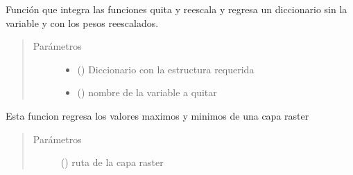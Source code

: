 \documentclass[letterpaper,10pt,spanish]{sphinxmanual}
\begin{document}

\begin{fulllineitems}
\label{\detokenize{analisis:sensibilidad_por_remocion_capas.quita_reescala}}
Función que integra las funciones quita y reescala y regresa
un diccionario sin la variable y con los pesos reescalados.
\begin{quote}\begin{description}
\item[{Parámetros}] \leavevmode\begin{itemize}
\item {} 
 () \textendash{} Diccionario con la estructura requerida

\item {} 
 () \textendash{} nombre de la variable a quitar

\end{itemize}

\end{description}\end{quote}

\end{fulllineitems}


\begin{fulllineitems}
\label{\detokenize{analisis:sensibilidad_por_remocion_capas.raster_min_max}}
Esta funcion regresa los valores maximos y minimos de una capa raster
\begin{quote}\begin{description}
\item[{Parámetros}] \leavevmode
{} () \textendash{} ruta de la capa raster

\end{description}\end{quote}

\end{fulllineitems}
\end{document}
